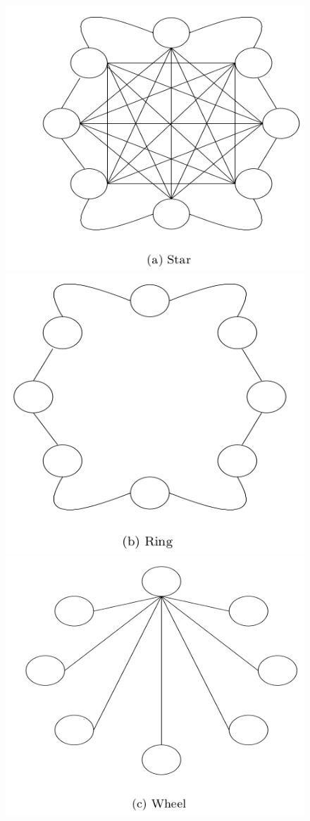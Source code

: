 \documentclass[a4paper]{article}
\begin{document}
\begin{figure}[htp]
    \centering
    \includegraphics[scale=0.15]{Star.png}
    \includegraphics[scale=0.15]{Ring.png}
    \includegraphics[scale=0.15]{Wheel.png}

\end{figure}
\end{document}
